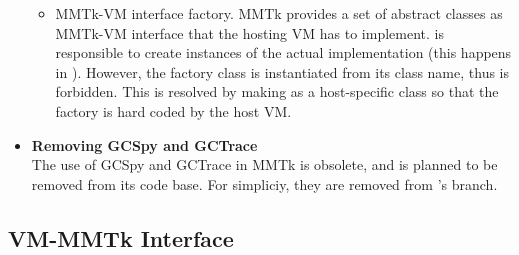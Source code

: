 \documentclass[12pt]{article}
\begin{document}
\begin{itemize}
\begin{itemize}
  \item MMTk-VM interface factory. 
  MMTk provides a set of abstract classes as MMTk-VM interface that 
  the hosting VM has to implement. 
  is responsible to create instances of the actual implementation (this
  happens in ). 
  However, the factory class is instantiated from its class name, thus
  is forbidden. This is resolved by making 
   as a host-specific class so 
  that the factory is hard coded by the host VM. 
  \end{itemize}

\item
\textbf{Removing GCSpy and GCTrace\\}
The use of GCSpy and GCTrace in MMTk is obsolete, and is planned to
be removed from its code base. For simpliciy, 
they are removed from \rjc 's branch. 

\end{itemize}

\subsection{VM-MMTk Interface}
\end{document}
